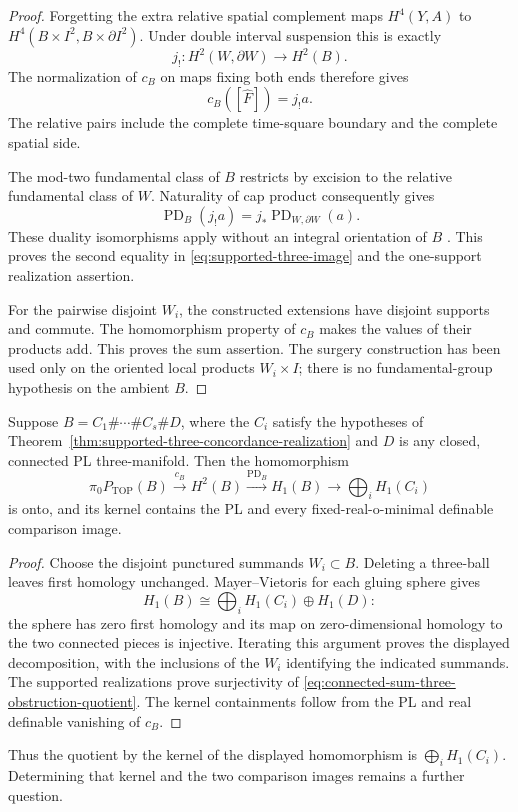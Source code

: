 \begin{proof}
Forgetting the extra relative spatial complement maps
$H^4(Y,A)$ to $H^4(B\times I^2,B\times\partial I^2)$.
Under double interval suspension this is exactly
\[
            j_!:H^2(W,\partial W)\longrightarrow H^2(B).
\]
The normalization of $c_B$ on maps fixing both ends
therefore gives
\begin{equation}\label{eq:supported-three-obstruction-value}
                      c_B([\widehat F])=j_!a.
\end{equation}
The relative pairs include the complete time-square boundary
and the complete spatial side.

The mod-two fundamental class of $B$ restricts by excision
to the relative fundamental class of $W$.  Naturality
of cap product consequently gives
\[
        \operatorname{PD}_B(j_!a)
          =j_*\operatorname{PD}_{W,\partial W}(a).
\]
These duality isomorphisms apply without an integral
orientation of $B$
\cite[Section~3.3, Theorem~3.43, p.~254]{Hatcher2002Algebraic}.
This proves the second equality in
\eqref{eq:supported-three-image} and the one-support
realization assertion.

For the pairwise disjoint $W_i$, the constructed extensions
have disjoint supports and commute.  The homomorphism
property of $c_B$ makes the values of their products add.
This proves the sum assertion.  The surgery construction
has been used only on the oriented local products
$W_i\times I$; there is no fundamental-group hypothesis
on the ambient $B$.
\end{proof}

\begin{corollary}\label{cor:connected-sum-three-obstruction-quotient}
Suppose $B=C_1\#\cdots\#C_s\#D$, where the $C_i$ satisfy
the hypotheses of
Theorem~\ref{thm:supported-three-concordance-realization}
and $D$ is any closed, connected PL three-manifold.
Then the homomorphism
\begin{equation}\label{eq:connected-sum-three-obstruction-quotient}
 \pi_0P_{\mathrm{TOP}}(B)\xrightarrow{c_B}H^2(B)
 \xrightarrow{\operatorname{PD}_B}H_1(B)
 \longrightarrow\bigoplus_i H_1(C_i)
\end{equation}
is onto, and its kernel contains the PL and every
fixed-real-o-minimal definable comparison image.
\end{corollary}

\begin{proof}
Choose the disjoint punctured summands $W_i\subset B$.
Deleting a three-ball leaves first homology unchanged.
Mayer--Vietoris for each gluing sphere gives
\[
 H_1(B)\cong\bigoplus_i H_1(C_i)\oplus H_1(D):
\]
the sphere has zero first homology and its map on
zero-dimensional homology to the two connected pieces
is injective.  Iterating this argument proves the
displayed decomposition, with the inclusions of the
$W_i$ identifying the indicated summands.
The supported realizations prove surjectivity of
\eqref{eq:connected-sum-three-obstruction-quotient}.
The kernel containments follow from the PL and real
definable vanishing of $c_B$.
\end{proof}

Thus the quotient by the kernel of the displayed homomorphism
is $\bigoplus_iH_1(C_i)$.  Determining that kernel and the
two comparison images remains a further question.
